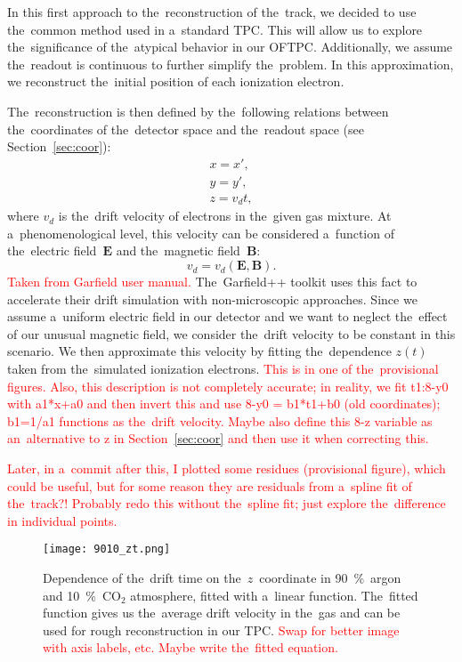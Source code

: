 		In this first approach to the~reconstruction of the~track, we decided to use the~common method used in a~standard \ac{TPC}. This will allow us to explore the~significance of the~atypical behavior in our \ac{OFTPC}. Additionally, we assume the~readout is continuous to further simplify the~problem. In this approximation, we reconstruct the~initial position of each ionization electron.
		
		The~reconstruction is then defined by the~following relations between the~coordinates of the~detector space and the~readout space (see Section~\ref{sec:coor}):
			\begin{eqnarray}
				x = x',\\
				y = y',\\
				z = v_d t,
			\end{eqnarray}
		where $v_d$ is the~drift velocity of electrons in the~given gas mixture. At a~phenomenological level, this velocity can be considered a~function of the~electric field~$\bm{E}$ and the~magnetic field~$\bm{B}$:
			\begin{equation}
				v_d = v_d(\bm{E},\bm{B}).
			\end{equation}
		\textcolor{red}{Taken from Garfield user manual.} The~Garfield++ toolkit uses this fact to accelerate their drift simulation with non-microscopic approaches. Since we assume a~uniform electric field in our detector and we want to neglect the~effect of our unusual magnetic field, we consider the~drift velocity to be constant in this scenario. We then approximate this velocity by fitting the~dependence $z(t)$ taken from the~simulated ionization electrons. \textcolor{red}{This is in one of the~provisional figures. Also, this description is not completely accurate; in reality, we fit t1:8-y0 with a1*x+a0 and then invert this and use 8-y0 = b1*t1+b0 (old coordinates); b1=1/a1 functions as the~drift velocity. Maybe also define this 8-z variable as an~alternative to z in Section~\ref{sec:coor} and then use it when correcting this.}
		
		\textcolor{red}{Later, in a~commit after this, I plotted some residues (provisional figure), which could be useful, but for some reason they are residuals from a~spline fit of the~track?! Probably redo this without the~spline fit; just explore the~difference in individual points.}
		
		\begin{figure}[H]
			\centering
			\texttt{[image: 9010\_zt.png]}
			\caption{Dependence of the~drift time on the~$z$~coordinate in 90~\%~argon and 10~\%~CO$_2$ atmosphere, fitted with a~linear function. The~fitted function gives us the~average drift velocity in the~gas and can be used for rough reconstruction in our \ac{TPC}. \textcolor{red}{Swap for better image with axis labels, etc. Maybe write the~fitted equation.}}
			\label{fig:9010zt}
		\end{figure}
		
